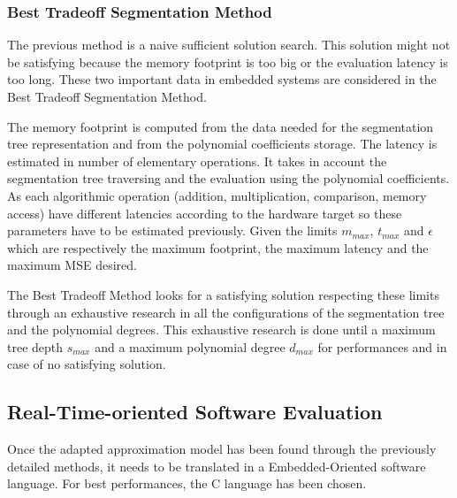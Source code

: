 \documentclass[fleqn,10pt]{SelfArx} %
\begin{document}
\subsubsection{Best Tradeoff Segmentation Method}
The previous method is a naive sufficient solution search. This solution might not be satisfying because the memory footprint is too big or the evaluation latency is too long. These two important data in embedded systems are considered in the Best Tradeoff Segmentation Method. 

The memory footprint is computed from the data needed for the segmentation tree representation and from the polynomial coefficients storage.
The latency is estimated in number of elementary operations. It takes in account the segmentation tree traversing and the evaluation using the polynomial coefficients. As each algorithmic operation (addition, multiplication, comparison, memory access) have different latencies according to the hardware target so these parameters have to be estimated previously.
Given the limits $m_{max}$, $t_{max}$ and $\epsilon$ which are respectively the maximum footprint, the maximum latency and the maximum MSE desired.

The Best Tradeoff Method looks for a satisfying solution respecting these limits through an exhaustive research in all the configurations of the segmentation tree and the polynomial degrees. This exhaustive research is done until a maximum tree depth $s_{max}$ and a maximum polynomial degree $d_{max}$ for performances and in case of no satisfying solution.

\subsection{Real-Time-oriented Software Evaluation}

Once the adapted approximation model has been found through the previously detailed methods, it needs to be translated in a Embedded-Oriented software language. For best performances, the C language has been chosen.
\end{document}
